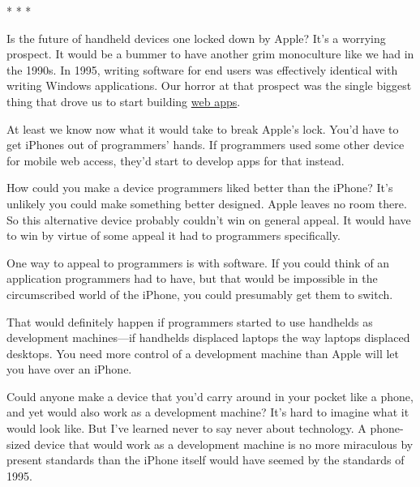                   * * *
                  

Is the future of handheld devices one locked down
                  by Apple? It's a worrying prospect. It would be a bummer to
                  have another grim monoculture like we had in the 1990s. In
                  1995, writing software for end users was effectively identical
                  with writing Windows applications. Our horror at that prospect
                  was the single biggest thing that drove us to start building
                  \href{http://www.paulgraham.com/road.html}{web apps}.

At least we know
                  now what it would take to break Apple's lock. You'd have to
                  get iPhones out of programmers' hands. If programmers used
                  some other device for mobile web access, they'd start to
                  develop apps for that instead.

How could you make a
                  device programmers liked better than the iPhone? It's unlikely
                  you could make something better designed. Apple leaves no room
                  there. So this alternative device probably couldn't win on
                  general appeal. It would have to win by virtue of some appeal
                  it had to programmers specifically.

One way to
                  appeal to programmers is with software. If you could think of
                  an application programmers had to have, but that would be
                  impossible in the circumscribed world of the iPhone, you could
                  presumably get them to switch.

That would
                  definitely happen if programmers started to use handhelds as
                  development machines---if handhelds displaced laptops the
                  way laptops displaced desktops. You need more control of a
                  development machine than Apple will let you have over an
                  iPhone.

Could anyone make a device that you'd carry
                  around in your pocket like a phone, and yet would also work as
                  a development machine? It's hard to imagine what it would look
                  like. But I've learned never to say never about technology. A
                  phone-sized device that would work as a development machine is
                  no more miraculous by present standards than the iPhone itself
                  would have seemed by the standards of 1995.


